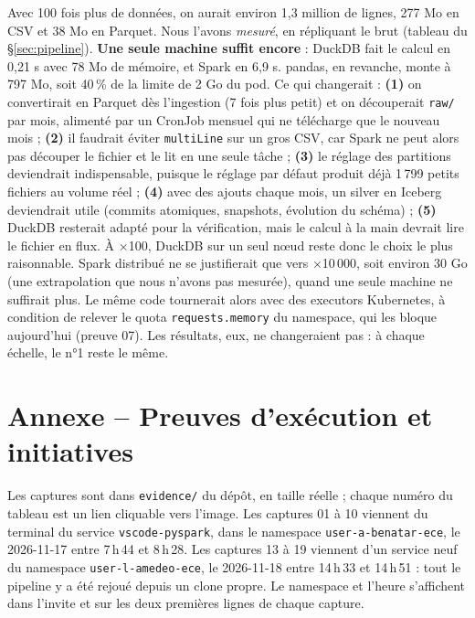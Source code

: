 \documentclass[10pt,a4paper]{article}
\newcommand{\code}[1]{\texttt{\small #1}}
\begin{document}
Avec 100 fois plus de données, on aurait environ 1,3 million de lignes, 277 Mo en CSV et 38 Mo en Parquet. Nous l'avons \emph{mesuré}, en répliquant le brut (tableau du §\ref{sec:pipeline}). \textbf{Une seule machine suffit encore} : DuckDB fait le calcul en 0,21 s avec 78 Mo de mémoire, et Spark en 6,9 s. pandas, en revanche, monte à 797 Mo, soit 40\,\% de la limite de 2 Go du pod. Ce qui changerait : \textbf{(1)} on convertirait en Parquet dès l'ingestion (7 fois plus petit) et on découperait \code{raw/} par mois, alimenté par un CronJob mensuel qui ne télécharge que le nouveau mois ; \textbf{(2)} il faudrait éviter \code{multiLine} sur un gros CSV, car Spark ne peut alors pas découper le fichier et le lit en une seule tâche ; \textbf{(3)} le réglage des partitions deviendrait indispensable, puisque le réglage par défaut produit déjà 1\,799 petits fichiers au volume réel ; \textbf{(4)} avec des ajouts chaque mois, un silver en Iceberg deviendrait utile (commits atomiques, snapshots, évolution du schéma) ; \textbf{(5)} DuckDB resterait adapté pour la vérification, mais le calcul à la main devrait lire le fichier en flux.
À ×100, DuckDB sur un seul nœud reste donc le choix le plus raisonnable. Spark distribué ne se justifierait que vers ×10\,000, soit environ 30 Go (une extrapolation que nous n'avons pas mesurée), quand une seule machine ne suffirait plus. Le même code tournerait alors avec des executors Kubernetes, à condition de relever le quota \code{requests.memory} du namespace, qui les bloque aujourd'hui (preuve 07). Les résultats, eux, ne changeraient pas : à chaque échelle, le n°1 reste le même.

\appendix
\section*{Annexe -- Preuves d'exécution et initiatives}\label{sec:preuves}

Les captures sont dans \code{evidence/} du dépôt, en taille réelle ; chaque numéro du tableau est un lien cliquable vers l'image. Les captures 01 à 10 viennent du terminal du service \code{vscode-pyspark}, dans le namespace \code{user-a-benatar-ece}, le 2026-11-17 entre 7\,h\,44 et 8\,h\,28. Les captures 13 à 19 viennent d'un service neuf du namespace \code{user-l-amedeo-ece}, le 2026-11-18 entre 14\,h\,33 et 14\,h\,51 : tout le pipeline y a été rejoué depuis un clone propre. Le namespace et l'heure s'affichent dans l'invite et sur les deux premières lignes de chaque capture.
\end{document}

